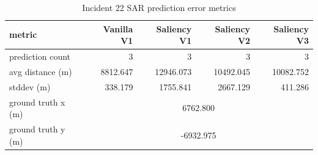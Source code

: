 \begin{table}[ht]
\centering
\caption{Incident 22 SAR prediction error metrics}
\label{tab:sar-incident-22}
\begin{tabular}{lrrrr}
\hline
metric & Vanilla V1 & Saliency V1 & Saliency V2 & Saliency V3 \\
\hline
prediction count & 3 & 3 & 3 & 3 \\
avg distance (m) & 8812.647 & 12946.073 & 10492.045 & 10082.752 \\
stddev (m) & 338.179 & 1755.841 & 2667.129 & 411.286 \\
ground truth x (m) & \multicolumn{4}{c}{6762.800} \\
ground truth y (m) & \multicolumn{4}{c}{-6932.975} \\
\hline
\end{tabular}
\end{table}
